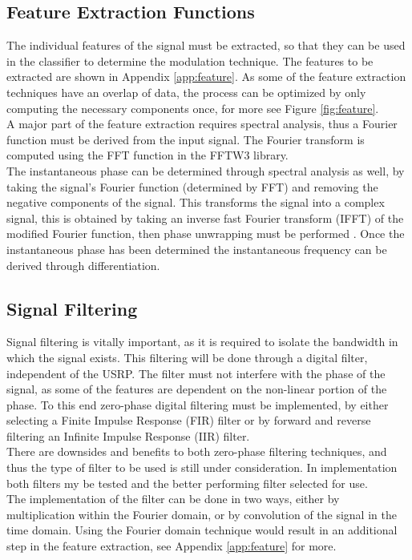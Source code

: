 \documentclass[10pt,twocolumn]{witseiepaper}
\begin{document}
	\subsection{Feature Extraction Functions}
	\label{subsec:feature_extract}
	The individual features of the signal must be extracted, so that they can be used in the classifier to determine the modulation technique. The features to be extracted are shown in Appendix \ref{app:feature}. As some of the feature extraction techniques have an overlap of data, the process can be optimized by only computing the necessary components once, for more see Figure \ref{fig:feature}.\\[10pt]
	A major part of the feature extraction requires spectral analysis, thus a Fourier function must be derived from the input signal. The Fourier transform is computed using the FFT function in the FFTW3 library.\\[10pt]
	The instantaneous phase can be determined through spectral analysis as well, by taking the signal's Fourier function (determined by FFT) and removing the negative components of the signal. This transforms the signal into a complex signal, this is obtained by taking an inverse fast Fourier transform (IFFT) of the modified Fourier function, then phase unwrapping must be performed \cite{zhu2014automatic,azzouz2013automatic}. Once the instantaneous phase has been determined the instantaneous frequency can be derived through differentiation. \\[10pt]

	\subsection{Signal Filtering}
	Signal filtering is vitally important, as it is required to isolate the bandwidth in which the signal exists. This filtering will be done through a digital filter, independent of the USRP. The filter must not interfere with the phase of the signal, as some of the features are dependent on the non-linear portion of the phase. To this end zero-phase digital filtering must be implemented, by either selecting a Finite Impulse Response (FIR) filter or by forward and reverse filtering an Infinite Impulse Response (IIR) filter.\\[10pt]
	There are downsides and benefits to both zero-phase filtering techniques, and thus the type of filter to be used is still under consideration. In implementation both filters my be tested and the better performing filter selected for use.\\[10pt]
	The implementation of the filter can be done in two ways, either by multiplication within the Fourier domain, or by convolution of the signal in the time domain. Using the Fourier domain technique would result in an additional step in the feature extraction, see Appendix \ref{app:feature} for more.
\end{document}

